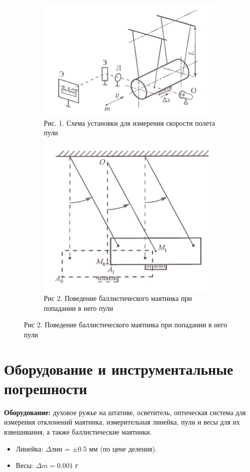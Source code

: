 \documentclass[a4paper, 12pt]{article}
\begin{document}
	
	\begin{figure}[h]
		
		\begin{subfigure}{0.5\textwidth}
			\includegraphics[width=0.9\linewidth]{1.png} 
			\caption{Рис. 1. Схема установки для измерения скорости полета пули}
			\label{fig:subim1}
		\end{subfigure}
		\begin{subfigure}{0.5\textwidth}
			\includegraphics[width=0.9\linewidth]{2.png}
			\caption{Рис 2. Поведение баллистического маятника при попадании в него пули}
			\label{fig:subim2}
		\end{subfigure}
		
	\end{figure}
	
	\section{Оборудование и инструментальные погрешности}
	\textbf{Оборудование:} духовое ружье на штативе, осветитель, оптическая система для измерения отклонений маятника, измерительная линейка, пули и весы для их взвешивания, а также баллистические маятники.
	\begin{itemize}
		\item Линейка: $\Delta \text{лин}$ = $\pm$0.5 мм (по цене деления).
		\item Весы: $\Delta m = 0.001\text{ г}$
	\end{itemize}
	
\end{document}
